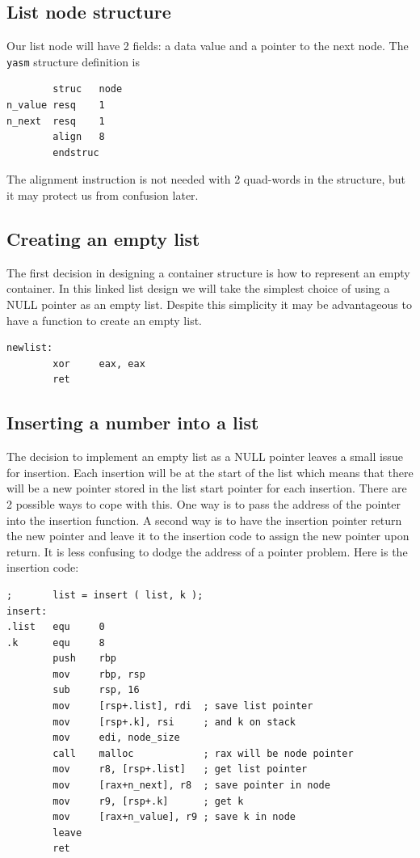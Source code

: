 \documentclass[11pt,b5paper]{book}
\begin{document}
\subsection{List node structure}

Our list node will have 2 fields: a data value and a pointer to the next
node.
The {\tt yasm} structure definition is
\begin{verbatim}
        struc   node
n_value resq    1
n_next  resq    1
        align   8
        endstruc
\end{verbatim}

The alignment instruction is not needed with 2 quad-words in the structure, but it may protect us from confusion later.

\subsection{Creating an empty list}

The first decision in designing a container structure is how to represent
an empty container.
In this linked list design we will take the simplest choice of using
a NULL pointer as an empty list.
Despite this simplicity it may be advantageous to 
have a function to create an empty list.

\begin{verbatim}
newlist:
        xor     eax, eax
        ret
\end{verbatim}

\subsection{Inserting a number into a list}

The decision to implement an empty list as a NULL pointer leaves a
small issue for insertion.
Each insertion will be at the start of the list which means that there
will be a new pointer stored in the list start pointer for each
insertion.
There are 2 possible ways to cope with this.
One way is to pass the address of the pointer into the insertion
function.
A second way is to have the insertion pointer return the new pointer
and leave it to the insertion code to assign the new pointer upon
return.
It is less confusing to dodge the address of a pointer problem.
Here is the insertion code:

\begin{verbatim}
;       list = insert ( list, k );
insert:
.list   equ     0
.k      equ     8
        push    rbp
        mov     rbp, rsp
        sub     rsp, 16
        mov     [rsp+.list], rdi  ; save list pointer
        mov     [rsp+.k], rsi     ; and k on stack
        mov     edi, node_size
        call    malloc            ; rax will be node pointer
        mov     r8, [rsp+.list]   ; get list pointer
        mov     [rax+n_next], r8  ; save pointer in node
        mov     r9, [rsp+.k]      ; get k
        mov     [rax+n_value], r9 ; save k in node
        leave
        ret
\end{verbatim}
\end{document}

